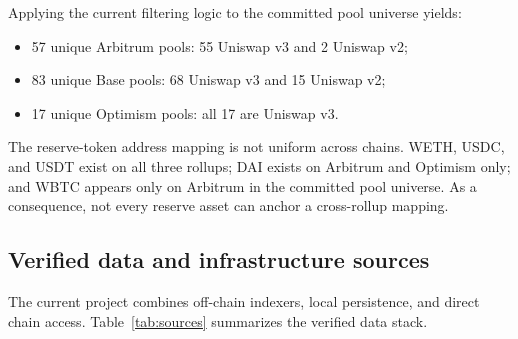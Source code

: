 \documentclass[11pt]{article}
\begin{document}
Applying the current filtering logic to the committed pool universe yields:
\begin{itemize}[leftmargin=1.5em]
    \item 57 unique Arbitrum pools: 55 Uniswap v3 and 2 Uniswap v2;
    \item 83 unique Base pools: 68 Uniswap v3 and 15 Uniswap v2;
    \item 17 unique Optimism pools: all 17 are Uniswap v3.
\end{itemize}

The reserve-token address mapping is not uniform across chains. WETH, USDC, and USDT exist on all three rollups; DAI exists on Arbitrum and Optimism only; and WBTC appears only on Arbitrum in the committed pool universe. As a consequence, not every reserve asset can anchor a cross-rollup mapping.

\subsection{Verified data and infrastructure sources}

The current project combines off-chain indexers, local persistence, and direct chain access. Table~\ref{tab:sources} summarizes the verified data stack.
\end{document}
